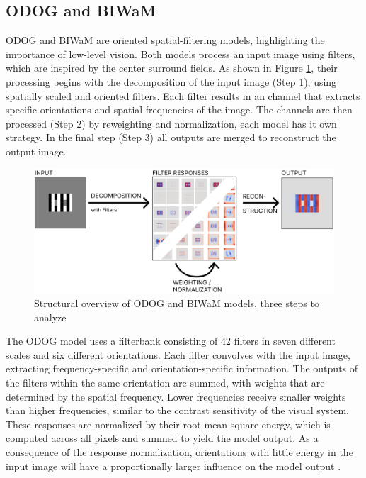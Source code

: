 \subsection{ODOG and BIWaM}

ODOG and BIWaM are oriented spatial-filtering models, highlighting the importance of
low-level vision. Both models process an input image using filters, which are inspired by
the center surround fields. As shown in Figure \ref{fig:figure7}, their processing begins
with the decomposition of the input image (Step 1), using spatially scaled and oriented
filters. Each filter results in an channel that extracts specific orientations and
spatial frequencies of the image. The channels are then processed (Step 2) by reweighting
and normalization, each model has it own strategy. In the final step (Step 3) all outputs
are merged to reconstruct the output image.

\begin{figure}[H]
    \centering
    \includegraphics[width=\linewidth]{media/methodology/models_overview.png}
    \begin{minipage}{0.7\textwidth}
    \caption[Structural overview of models]{Structural overview of ODOG and BIWaM models, three steps to analyze}
    \label{fig:figure7}
    \end{minipage}
\end{figure}

The ODOG model uses a filterbank consisting of 42 filters in seven different scales and
six different orientations. Each filter convolves with the input image, extracting
frequency-specific and orientation-specific information. The outputs of the filters within
the same orientation are summed, with weights that are determined by the spatial
frequency. Lower frequencies receive smaller weights than higher frequencies, similar to
the contrast sensitivity of the visual system. These responses are normalized by their
root-mean-square energy, which is computed across all pixels and summed to yield the model
output. As a consequence of the response normalization, orientations with little energy in
the input image will have a proportionally larger influence on the model output
\parencite{Betz2015}.

